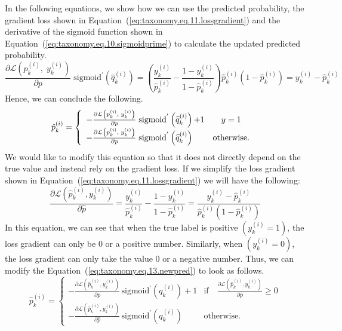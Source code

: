 In the following equations, we show how we can use the predicted probability, the gradient loss shown in Equation~(\ref{eq:taxonomy.eq.11.lossgradient}) and the derivative of the sigmoid function shown in Equation~(\ref{eq:taxonomy.eq.10.sigmoidprime}) to calculate the updated predicted probability.
\begin{equation}
\label{eq:taxonomy.eq.12.newpredelement}
\frac{\partial \mathcal{L}\left(p_k^{(i)},\; y_k^{(i)}\right)}{\partial p}\;\text{sigmoid}^{'}\left(\widehat{q}_k^{(i)}\right)=\left(\frac{y_k^{(i)}}{\widehat{p}_k^{(i)}}-\frac{1-y_k^{(i)}}{1-\widehat{p}_k^{(i)}}\right)\widehat{p}_k^{(i)}\left(1-\widehat{p}_k^{(i)}\right)=y_k^{(i)}-\widehat{p}_k^{(i)}
\end{equation}
Hence, we can conclude the following.
\begin{equation}
    \label{eq:taxonomy.eq.13.newpred}
    \begin{array}{@{}l}\hat{p}_{k}^{(i)} = \left\{\begin{array}{lc}-\frac{\partial \mathcal{L}\left(p_k^{(i)},\;y_k^{(i)}\right)}{\partial p}\;\text{sigmoid}^{'}\left(\widehat{q}_k^{(i)}\right)\text{+1}&y=1\\-\frac{\partial \mathcal{L}\left(p_k^{(i)},\;y_k^{(i)}\right)}{\partial p}\;\text{sigmoid}^{'}\left(\widehat{q}_k^{(i)}\right) & \text{otherwise.} \end{array}\right.\end{array}
\end{equation}
We would like to modify this equation so that it does not directly depend on the true value and instead rely on the gradient loss. If we simplify the loss gradient shown in Equation~(\ref{eq:taxonomy.eq.11.lossgradient})  we will have the following:
\begin{equation}
    \label{eq:taxonomy.eq.14.newlossgradient}
    \frac{\partial \mathcal{L}(\widehat{p}_k^{(i)}, y_k^{(i)})}{\partial \widehat{p}} = \frac{y_k^{(i)}}{\widehat{p}_k^{(i)}} - \frac{1 - y_k^{(i)}}{1 - \widehat{p}_k^{(i)}} = \frac{y_k^{(i)} - \widehat{p}_k^{(i)}}{\widehat{p}_k^{(i)}(1 - \widehat{p}_k^{(i)})}
\end{equation}
In this equation, we can see that when the true label is positive $\left(y_k^{(i)}=1\right) $, the loss gradient can only be 0 or a positive number. Similarly, when $\left(y_k^{(i)}=0\right) $, the loss gradient can only take the value 0 or a negative number. Thus, we can modify the Equation~(\ref{eq:taxonomy.eq.13.newpred})  to look as follows.
\begin{equation}
    \label{eq:taxonomy.eq.15.newpred}
    \widehat{p}_k^{(i)} =
    \begin{cases}
        -\frac{\partial \mathcal{L}(\widehat{p}_k^{(i)}, y_k^{(i)})}{\partial \widehat{p}} \, \text{sigmoid}^{\prime}(q_k^{(i)}) + 1 & \text{if} \quad \frac{\partial \mathcal{L}(\widehat{p}_k^{(i)}, y_k^{(i)})}{\partial \widehat{p}} \geq 0 \\
        -\frac{\partial \mathcal{L}(\widehat{p}_k^{(i)}, y_k^{(i)})}{\partial \widehat{p}} \, \text{sigmoid}^{\prime}(q_k^{(i)}) & \text{otherwise.}
    \end{cases}
\end{equation}

